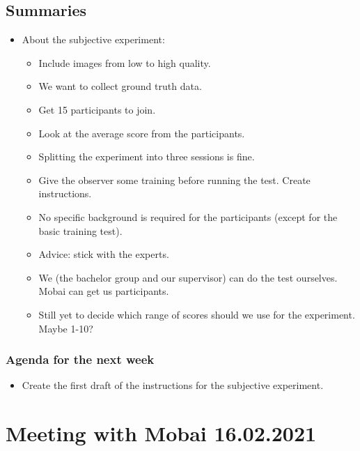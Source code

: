 \subsection*{Summaries}
\begin{itemize}
\item About the subjective experiment:
    \begin{itemize}
    \item Include images from low to high quality.
    \item We want to collect ground truth data.
    \item Get 15 participants to join.
    \item Look at the average score from the participants.
    \item Splitting the experiment into three sessions is fine.
    \item Give the observer some training before running the test. Create instructions.
    \item No specific background is required for the participants (except for the basic training test). 
    \item Advice: stick with the experts.
    \item We (the bachelor group and our supervisor) can do the test ourselves.
    Mobai can get us participants. 
    \item Still yet to decide which range of scores should we use for the experiment. Maybe 1-10? 
    \end{itemize}
\end{itemize}

\subsubsection*{Agenda for the next week}
\begin{itemize}
    \item Create the first draft of the instructions for the subjective experiment.
\end{itemize}


\section*{Meeting with Mobai 16.02.2021}
